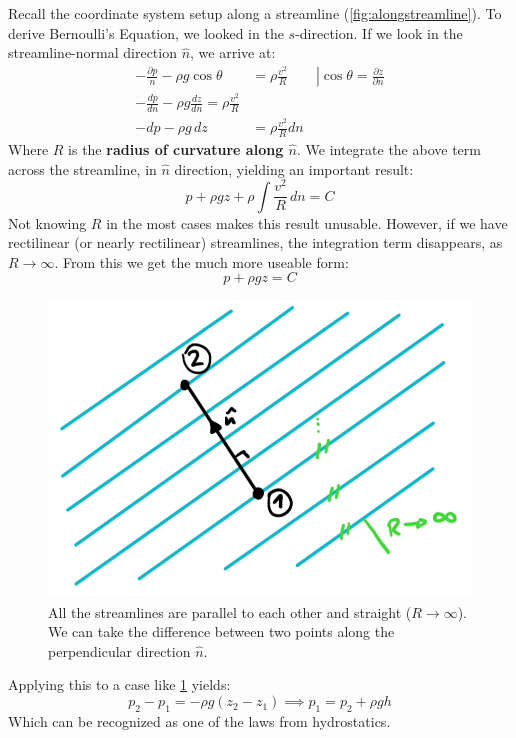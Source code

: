 Recall the coordinate system setup along a streamline (\ref{fig:alongstreamline}). To derive Bernoulli's Equation, we looked in the $s$-direction. If we look in the streamline-normal direction $\hat n$, we arrive at:
\begin{equation*}
	\begin{split}
		-\frac{\partial p}{n}-\rho g \cos \theta &= \rho \frac {v^2}R\qquad \left| \cos \theta= \frac{\partial z}{\partial n}\right.\\
		-\frac {dp}{dn}-\rho g \frac{dz}{dn} = \rho \frac{v^2}R\\
		-dp - \rho g \,dz &= \rho \frac{v^2}R dn
	\end{split}
\end{equation*}
Where $R$ is the \textbf{radius of curvature along $\hat n$}. We integrate the above term across the streamline, in $\hat n$ direction, yielding an important result:
\begin{equation}
		 \boxed{p + \rho gz + \rho \int \frac{v^2}{R}\,dn = C}
\end{equation}
Not knowing $R$ in the most cases makes this result unusable. However, if we have rectilinear (or nearly rectilinear) streamlines, the integration term disappears, as $R \to \infty$. From this we get the much more useable form:
\begin{equation}
	\boxed{p + \rho gz = C}
\end{equation}
\begin{figure}[H]
	\centering
	\includegraphics[width=0.4\linewidth]{Sketches/RectilinearStreamLines}
	\caption{All the streamlines are parallel to each other and straight ($R\to \infty$). We can take the difference between two points along the perpendicular direction $\hat n$.}
	\label{fig:rectilinearstreamlines}
\end{figure}
Applying this to a case like \ref{fig:rectilinearstreamlines} yields:
\begin{equation}
	p_2-p_1 = -\rho g (z_2-z_1) \implies p_1 = p_2+\rho gh
\end{equation}
Which can be recognized as one of the laws from hydrostatics.


